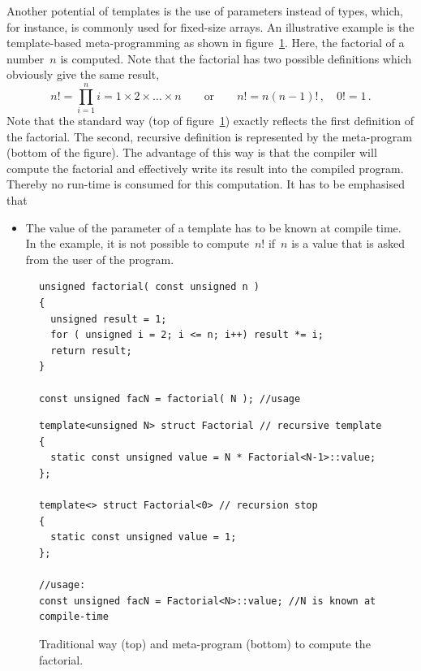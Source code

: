 \documentclass[a4paper,DIV=12,10pt]{scrartcl}
\begin{document}
Another potential of templates is the use of parameters instead of
types, which, for instance, is commonly used for fixed-size arrays. An
illustrative example is the template-based meta-programming as shown
in figure~\ref{fig:meta}. Here, the factorial of a number~$n$ is
computed. Note that the factorial has two possible definitions which
obviously give the same result,
\begin{equation*}
  n! = \prod_{i=1}^n i = 1 \times 2 \times \dots \times n 
  \qquad \text{or} \qquad
  n! = n (n-1)!\,, \quad 0! = 1\,.
\end{equation*}
Note that the standard way (top of figure~\ref{fig:meta}) exactly
reflects the first definition of the factorial. The second, recursive
definition is represented by the meta-program (bottom of the figure).
The advantage of this way is that the compiler will compute the
factorial and effectively write its result into the compiled
program. Thereby no run-time is consumed for this computation. 
It has to be emphasised that
\begin{itemize}
\item The value of the parameter of a template has to be known at
  compile time. In the example, it is not possible to compute~$n!$
  if~$n$ is a value that is asked from the user of the program.
\end{itemize}

\begin{figure}[htbp]
  \centering
        \begin{verbatim}
unsigned factorial( const unsigned n ) 
{
  unsigned result = 1;
  for ( unsigned i = 2; i <= n; i++) result *= i;
  return result;
}

const unsigned facN = factorial( N ); //usage
  \end{verbatim}
  \begin{verbatim}
template<unsigned N> struct Factorial // recursive template
{
  static const unsigned value = N * Factorial<N-1>::value;
};

template<> struct Factorial<0> // recursion stop
{
  static const unsigned value = 1;
};

//usage:
const unsigned facN = Factorial<N>::value; //N is known at compile-time
  \end{verbatim}

  \caption{Traditional way (top) and meta-program (bottom) to compute the factorial.}
  \label{fig:meta}
\end{figure}
\end{document}
